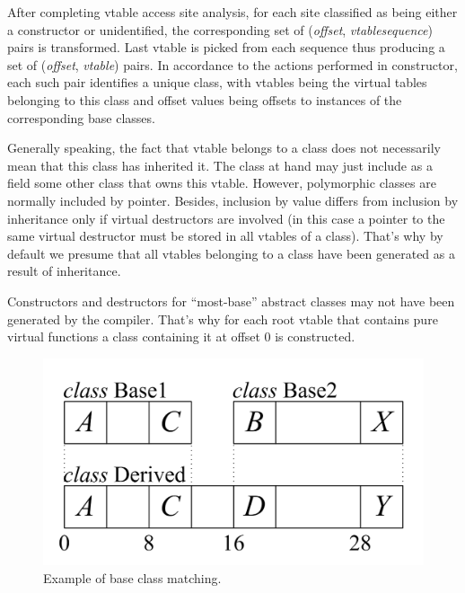 \documentclass[10pt, conference]{IEEEtran}
\newcommand{\offset}{\textit{offset}}
\newcommand{\vtable}{\textit{vtable}}
\newcommand{\sequence}{\textit{sequence}}
\begin{document}
After completing vtable access site analysis, for each site
classified as being either a constructor or unidentified, the
corresponding set of (\offset, \vtable\:\sequence) pairs
is transformed. Last vtable is picked from each sequence
thus producing a set of (\offset, \vtable) pairs. In
accordance to the actions performed in constructor, each
such pair identifies a unique class, with vtables being
the virtual tables belonging to this class and offset values
being offsets to instances of the corresponding base classes.

Generally speaking, the fact that vtable belongs to a class does not
necessarily mean that this class has inherited it.
The class at hand may just include as a field some other class
that owns this vtable.
However, polymorphic classes are normally included by pointer.
Besides, inclusion by value differs from inclusion by inheritance
only if virtual destructors are involved (in this case a pointer to
the same virtual destructor must be stored in all vtables of a class).
That's why by default we presume that all vtables belonging to
a class have been generated as a result of inheritance.

Constructors and destructors for ``most-base'' abstract classes
may not have been generated by the compiler. That's why for each
root vtable that contains pure virtual functions
a class containing it at offset 0 is constructed.

\begin{figure}[tb!]
\centering
  \includegraphics[scale=1.80]{images/multiple}
\caption{Example of base class matching.}
\label{fig:multiple}
\end{figure}
\end{document}
